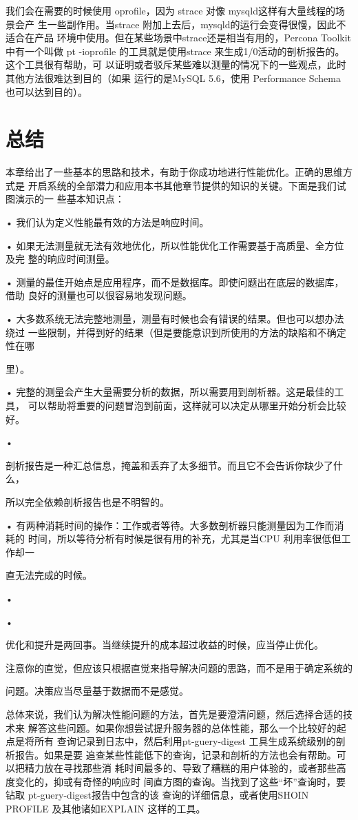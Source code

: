 {我们会在需要的时候使用 oprofile，因为 strace 对像 mysqld这样有大量线程的场景会产
生一些副作用。当strace 附加上去后，mysqld的运行会变得很慢，因此不适合在产品
环境中使用。但在某些场景中strace还是相当有用的，Percona Toolkit 中有一个叫做 pt
-ioprofile 的工具就是使用strace 来生成1/0活动的剖析报告的。这个工具很有帮助，可
以证明或者驳斥某些难以测量的情况下的一些观点，此时其他方法很难达到目的（如果
运行的是MySQL 5.6，使用 Performance Schema 也可以达到目的）。

\section{总结}
本章给出了一些基本的思路和技术，有助于你成功地进行性能优化。正确的思维方式是
开启系统的全部潜力和应用本书其他章节提供的知识的关键。下面是我们试图演示的一
些基本知识点：

• 我们认为定义性能最有效的方法是响应时间。

• 如果无法测量就无法有效地优化，所以性能优化工作需要基于高质量、全方位及完
整的晌应时间测量。

• 测量的最佳开始点是应用程序，而不是数据库。即使问题出在底层的数据库，借助
良好的测量也可以很容易地发现问题。

• 大多数系统无法完整地测量，测量有时候也会有错误的结果。但也可以想办法绕过
一些限制，并得到好的结果（但是要能意识到所使用的方法的缺陷和不确定性在哪

里）。

• 完整的测量会产生大量需要分析的数据，所以需要用到剖析器。这是最佳的工具，
可以帮助将重要的问题冒泡到前面，这样就可以决定从哪里开始分析会比较好。

•

剖析报告是一种汇总信息，掩盖和丢弃了太多细节。而且它不会告诉你缺少了什么，

所以完全依赖剖析报告也是不明智的。

• 有两种消耗时间的操作：工作或者等待。大多数剖析器只能测量因为工作而消耗的
时间，所以等待分析有时候是很有用的补充，尤其是当CPU 利用率很低但工作却一

直无法完成的时候。

•

•

优化和提升是两回事。当继续提升的成本超过收益的时候，应当停止优化。

注意你的直觉，但应该只根据直觉来指导解决问题的思路，而不是用于确定系统的

问题。决策应当尽量基于数据而不是感觉。

总体来说，我们认为解决性能问题的方法，首先是要澄清问题，然后选择合适的技术来
解答这些问题。如果你想尝试提升服务器的总体性能，那么一个比较好的起点是将所有
查询记录到日志中，然后利用pt-guery-digest 工具生成系统级别的剖析报告。如果是要
追查某些性能低下的查询，记录和剖析的方法也会有帮助。可以把精力放在寻找那些消
耗时间最多的、导致了糟糕的用户体验的，或者那些高度变化的，抑或有奇怪的响应时
间直方图的查询。当找到了这些“坏”查询时，要钻取 pt-guery-digest报告中包含的该
查询的详细信息，或者使用SHOIN PROFILE 及其他诸如EXPLAIN 这样的工具。

}
